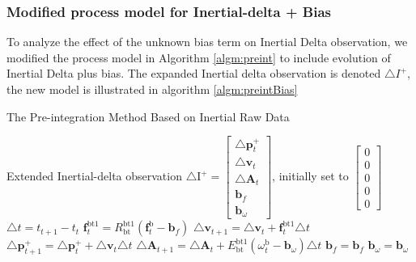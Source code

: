 \documentclass[12pt]{article}   %
\begin{document}
\subsubsection{Modified process model for Inertial-delta + Bias}
To analyze the effect of the unknown bias term on Inertial Delta observation, we modified the process model in Algorithm \ref{algm:preint} to include evolution of Inertial Delta plus bias. The expanded Inertial delta observation is denoted $\triangle I^+$, the new model is illustrated in algorithm \ref{algm:preintBias}
\begin{algorithm}
	\caption{The Pre-integration Method Based on Inertial Raw Data}
	\label{algm:preintBias}		
	\begin{algorithmic}
		\STATE Extended Inertial-delta observation $ \triangle \bm{\mathrm{I}}^+ = \begin{bmatrix} 
		\triangle \textbf{p}_{t}^+ \\
		\triangle \textbf{v}_{t} \\
		\triangle \textbf{A} _{t} \\
		\textbf{b}_f \\
		\textbf{b}_{\omega}
		\end{bmatrix}$, initially set to $\begin{bmatrix} 
		0 \\ 
		0 \\ 
		0 \\
		0 \\
		0
		\end{bmatrix}$
			\STATE $\triangle t =  t_{t+1} - t_t$ 
			\STATE $\textbf{f}_t^{\mathrm{bt1}} = R_{\mathrm{bt}}^{\mathrm{bt1}} (\textbf{f}_t^{\mathrm{b}} - \textbf{b}_f)$ 
			\STATE $\triangle \textbf{v}_{t+1} = \triangle \textbf{v}_{t} + \textbf{f}_t^{\mathrm{bt1}} \triangle t$ 
			\STATE $\triangle \textbf{p}_{t+1}^+ = \triangle \textbf{p}_{t}^+ + \triangle \textbf{v}_t \triangle t$ 
			\STATE $\triangle \textbf{A} _{t+1} = \triangle \textbf{A} _{t} + E_{\mathrm{bt}}^{\mathrm{bt1}} (\omega _t^{\mathrm{b}} - \textbf{b}_\omega ) \triangle t$ 
			\STATE $\textbf{b}_f = \textbf{b}_f$
			\STATE $\textbf{b}_{\omega} = \textbf{b}_{\omega}$
		\ENDFOR
	\end{algorithmic}
\end{algorithm}
\end{document}
